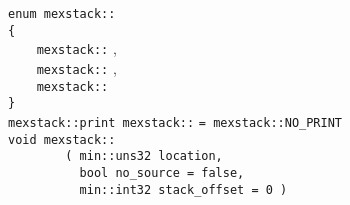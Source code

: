 \documentclass[12pt]{article}
\begin{document}
\verb|enum mexstack::|  \\
\verb|{| \\
\verb|    mexstack::| , \\
\verb|    mexstack::| , \\
\verb|    mexstack::|  \\
\verb|}| \\
\verb|mexstack::print mexstack::| 
    \verb|= mexstack::NO_PRINT| \\
\verb|void mexstack::| \label{PRINT-INSTR} \\
\verb|        ( min::uns32 location,| \\
\verb|          bool no_source = false,| \\
\verb|          min::int32 stack_offset = 0 )|
\end{document}
